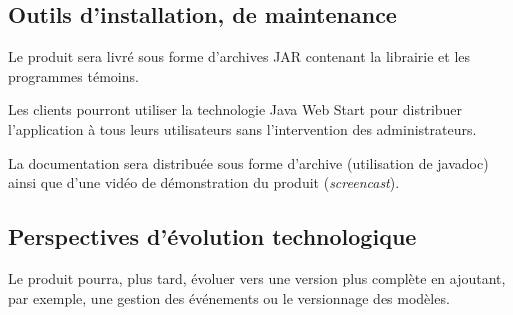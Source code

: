 \subsection{Outils d’installation, de maintenance}

Le produit sera livré sous forme d'archives JAR contenant la librairie et les programmes témoins.

Les clients pourront utiliser la technologie Java Web Start pour distribuer l'application à tous leurs utilisateurs sans l'intervention des administrateurs.

La documentation sera distribuée sous forme d'archive (utilisation de javadoc) ainsi que d'une vidéo de démonstration du produit (\emph{screencast}).

\subsection{Perspectives d’évolution technologique}

Le produit pourra, plus tard, évoluer vers une version plus complète en ajoutant, par exemple, une gestion des événements ou le versionnage des modèles.